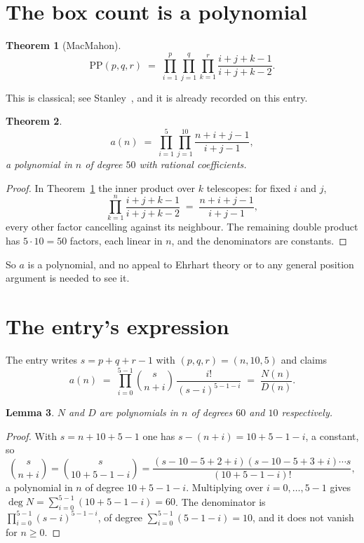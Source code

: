 \documentclass[11pt,a4paper]{article}
\theoremstyle{plain}
\newtheorem{theorem}{Theorem}
\newtheorem{lemma}[theorem]{Lemma}
\theoremstyle{definition}
\begin{document}
\section{The box count is a polynomial}

\begin{theorem}[MacMahon]\label{thm:mm}
\[
\mathrm{PP}(p,q,r)\;=\;\prod_{i=1}^{p}\prod_{j=1}^{q}\prod_{k=1}^{r}
\frac{i+j+k-1}{i+j+k-2} .
\]
\end{theorem}

This is classical; see Stanley~\cite{stanley}, and it is already recorded on this entry.

\begin{theorem}\label{thm:poly}
\[
a(n)\;=\;\prod_{i=1}^{5}\prod_{j=1}^{10}\frac{n+i+j-1}{i+j-1},
\]
a polynomial in $n$ of degree $50$ with rational coefficients.
\end{theorem}

\begin{proof}
In Theorem~\ref{thm:mm} the inner product over $k$ telescopes: for fixed $i$ and $j$,
\[
\prod_{k=1}^{n}\frac{i+j+k-1}{i+j+k-2}\;=\;\frac{n+i+j-1}{i+j-1} ,
\]
every other factor cancelling against its neighbour. The remaining double product has
$5\cdot10=50$ factors, each linear in $n$, and the denominators are constants.
\end{proof}

So $a$ is a polynomial, and no appeal to Ehrhart theory or to any general position argument is
needed to see it.

\section{The entry's expression}

The entry writes $s=p+q+r-1$ with $(p,q,r)=(n,10,5)$ and claims
\[
a(n)\;=\;\prod_{i=0}^{5-1}\binom{s}{n+i}\,\frac{i!}{(s-i)^{5-1-i}}\;=\;
\frac{N(n)}{D(n)} .
\]

\begin{lemma}\label{lem:deg}
$N$ and $D$ are polynomials in $n$ of degrees $60$ and $10$ respectively.
\end{lemma}

\begin{proof}
With $s=n+10+5-1$ one has $s-(n+i)=10+5-1-i$, a constant, so
\[
\binom{s}{n+i}=\binom{s}{10+5-1-i}
=\frac{(s-10-5+2+i)(s-10-5+3+i)\cdots s}{(10+5-1-i)!},
\]
a polynomial in $n$ of degree $10+5-1-i$. Multiplying over $i=0,\dots,5-1$ gives
$\deg N=\sum_{i=0}^{5-1}(10+5-1-i)=60$. The denominator is
$\prod_{i=0}^{5-1}(s-i)^{5-1-i}$, of degree
$\sum_{i=0}^{5-1}(5-1-i)=10$, and it does not vanish for $n\ge0$.
\end{proof}
\end{document}
